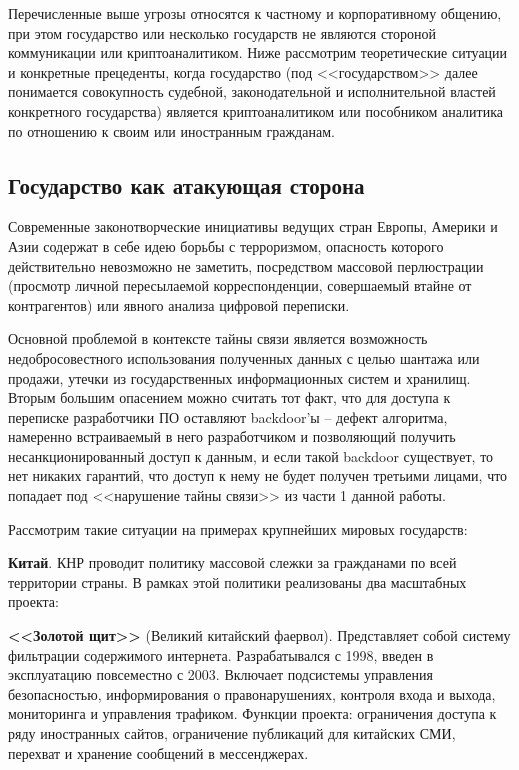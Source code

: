 	Перечисленные выше угрозы относятся к частному и корпоративному общению, при этом государство или несколько государств не являются  стороной коммуникации или криптоаналитиком. Ниже рассмотрим теоретические ситуации и конкретные прецеденты, когда государство (под <<государством>> далее понимается совокупность судебной, законодательной и исполнительной властей конкретного государства) является криптоаналитиком или пособником аналитика по отношению к своим или иностранным гражданам. 
	\subsection{Государство как атакующая сторона}
	
	Современные законотворческие инициативы  ведущих стран Европы, Америки и Азии содержат в себе идею борьбы с терроризмом, опасность которого действительно невозможно не заметить, посредством массовой перлюстрации (просмотр личной пересылаемой корреспонденции, совершаемый втайне от контрагентов) или явного анализа цифровой переписки. 
	
	Основной проблемой в контексте тайны связи является возможность недобросовестного использования полученных данных с целью шантажа или  продажи, утечки из государственных информационных систем и хранилищ. Вторым большим опасением можно считать тот факт, что для доступа к переписке разработчики ПО оставляют backdoor'ы -- дефект алгоритма,  намеренно встраиваемый  в него разработчиком и позволяющий  получить несанкционированный доступ к данным, и если такой backdoor существует, то нет никаких гарантий, что доступ к нему не будет получен третьими лицами, что попадает под <<нарушение тайны связи>> из части 1 данной работы.

	Рассмотрим такие ситуации на примерах крупнейших мировых государств:
		
	 \textbf{Китай}. КНР проводит политику массовой слежки за гражданами по всей территории страны. В рамках этой политики реализованы два масштабных проекта: 
	
	\textbf{<<Золотой щит>>} (Великий китайский фаервол). Представляет собой  систему фильтрации содержимого интернета. Разрабатывался с 1998, введен в эксплуатацию повсеместно с 2003. Включает подсистемы управления безопасностью, информирования о правонарушениях, контроля входа и выхода, мониторинга и управления трафиком.  Функции проекта: ограничения доступа к ряду иностранных сайтов, ограничение публикаций для китайских СМИ, перехват и хранение сообщений в мессенджерах.
	

